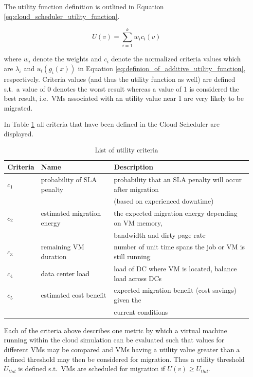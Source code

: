 The utility function definition is outlined in Equation \ref{eq:cloud_scheduler_utility_function}. 

\begin{equation}
	U(v) = \sum_{i=1}^k w_i c_i (v)
\label{eq:cloud_scheduler_utility_function}
\end{equation}

where $w_i$ denote the weights and $c_i$ denote the normalized criteria values which are $\lambda_i$ and $u_i(g_i(x))$ in Equation \ref{eq:definion_of_additive_utility_function}, respectively. Criteria values (and thus the utility function as well) are defined s.t.~a value of 0 denotes the worst result whereas a value of 1 is considered the best result, i.e.~VMs associated with an utility value near 1 are very likely to be migrated. 

In Table \ref{tab:list_of_utility_criteria} all criteria that have been defined in the Cloud Scheduler are displayed. 

\begin{table}[htbp]
\centering
\begin{tabular}{lll}
  \hline
	Criteria & Name	& Description \\
  \hline
	$c_1$ & probability of SLA penalty & probability that an SLA penalty will occur after migration \\
																	  && (based on experienced downtime) \\
	$c_2$ & estimated migration energy & the expected migration energy depending on VM memory, \\
																		&& bandwidth and dirty page rate \\
	$c_3$ & remaining VM duration & number of unit time spans the job or VM is still running \\
	$c_4$ & data center load & load of DC where VM is located, balance load across DCs \\
	$c_5$ & estimated cost benefit & expected migration benefit (cost savings) given the \\
																		&& current conditions \\
   \hline
\end{tabular}
\caption{List of utility criteria}
\label{tab:list_of_utility_criteria}
\end{table}

Each of the criteria above describes one metric by which a virtual machine running within the cloud simulation can be evaluated such that values for different VMs may be compared and VMs having a utility value greater than a defined threshold may then be considered for migration. Thus a utility threshold $U_{thd}$ is defined s.t.~VMs are scheduled for migration if $U(v) \geq U_{thd}$. 

